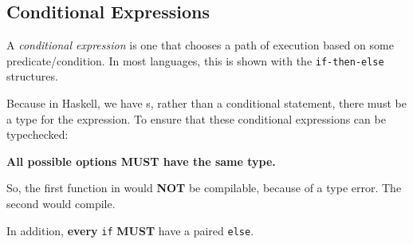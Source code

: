 \subsection{Conditional Expressions}\label{subsec:Conditional_Expressions}
\begin{definition}\label{def:Conditional_Expression}
  A \emph{conditional expression} is one that chooses a path of execution based on some predicate/condition.
  In most languages, this is shown with the \texttt{if-then-else} structures.
\end{definition}

Because in Haskell, we have s, rather than a conditional statement, there must be a type for the expression.
To ensure that these conditional expressions can be typechecked:
\begin{blackbox}
  \large{\textbf{All possible options MUST have the same type.}}
\end{blackbox}

So, the first function in  would \textbf{NOT} be compilable, because of a type error.
The second would compile.
\begin{listing}[h!tbp]
\end{listing}

\begin{blackbox}
  In addition, \textbf{every} \texttt{if} \textbf{MUST} have a paired \texttt{else}.
\end{blackbox}


